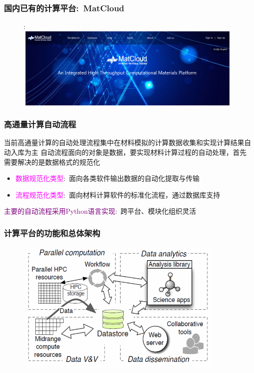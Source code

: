 {{\frame
{
	\frametitle{国内已有的计算平台:~\textrm{MatCloud}}
\begin{figure}[h!]:
\centering
\includegraphics[height=1.57in,width=4.95in,viewport=0 0 1800 550,clip]{Figures/Matcloud-login.png}
\caption{\fontsize{7.2pt}{4.2pt}\selectfont{中科院计算机网络信息中心~杨小渝团队开发}}%
\label{Auto_Flow_Platform-2}
\end{figure}
}

\frame
{
	\frametitle{高通量计算自动流程} 
当前高通量计算的自动处理流程集中在材料模拟的计算数据收集和实现计算结果自动入库为主
\vskip 2pt
{\fontsize{7.5pt}{4.2pt}\selectfont{材料第一原理计算的软件有很多，输出文件的格式千差万别，通过第一原理计算构建相对完善的材料数据库需要耗费相当的计算资源和人力}}
\vskip 5pt
自动流程面向的对象是数据，要实现材料计算过程的自动处理，首先需要解决的是数据格式的规范化
\begin{itemize}
	\item \textcolor{magenta}{数据规范化类型}:~面向各类软件输出数据的自动化提取与传输
\vskip 2pt
{\fontsize{6.5pt}{4.2pt}}
\item \textcolor{magenta}{流程规范化类型}:~面向材料计算软件的标准化流程，通过数据库支持 
\vskip 2pt
{\fontsize{6.5pt}{4.2pt}}
\end{itemize}
\textcolor{purple}{主要的自动流程采用\textrm{Python}语言实现}:~跨平台、模块化组织灵活
}

\frame
{
	\frametitle{计算平台的功能和总体架构}
\begin{figure}[h!]
\centering
\vspace*{-0.35in}
\includegraphics[height=2.6in,width=4.05in,viewport=0 0 670 460,clip]{Figures/Parallel_computation.png}
\caption{\fontsize{7.2pt}{4.2pt}}%
\label{Auto_Flow}
\end{figure} 
}

}}
